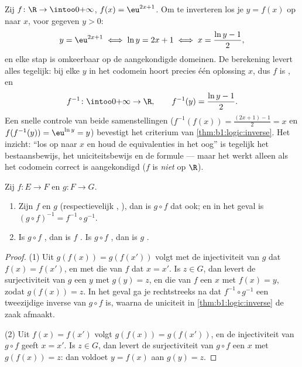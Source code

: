 \begin{example}\label{ex:b1:logic:inversecomp}
Zij $f \colon \R \to \intoo0{+\infty}$, $f(x) = \eu^{2x+1}$. Om te
inverteren los je $y = f(x)$ op naar $x$, voor gegeven $y > 0$:
\[
y = \eu^{2x+1} \iff \ln y = 2x + 1 \iff x = \frac{\ln y - 1}2 ,
\]
en elke stap is omkeerbaar op de aangekondigde domeinen. De berekening
levert alles tegelijk: bij elke $y$ in het codomein hoort precies één
oplossing $x$, dus $f$ is , en
\[
f^{-1} \colon \intoo0{+\infty} \to \R,
\qquad
f^{-1}(y) = \frac{\ln y - 1}2 .
\]
Een snelle controle van beide samenstellingen ($f^{-1}(f(x)) =
\frac{(2x+1) - 1}2 = x$ en $f(f^{-1}(y)) = \eu^{\ln y} = y$) bevestigt
het criterium van \cref{thm:b1:logic:inverse}. Het inzicht: ``los op naar
$x$ en houd de equivalenties in het oog'' is tegelijk het bestaansbewijs,
het uniciteitsbewijs en de formule --- maar het werkt alleen als het
codomein correct is aangekondigd ($f$ is \emph{niet}  op $\R$).
\end{example}

\begin{proposition}\label{prop:b1:logic:comp}
Zij $f \colon E \to F$ en $g \colon F \to G$.
\begin{enumerate}
  \item Zijn $f$ en $g$  (respectievelijk ,
        ), dan is $g \circ f$ dat ook; en in het 
        geval is $(g \circ f)^{-1} = f^{-1} \circ g^{-1}$.
  \item Is $g \circ f$ , dan is $f$ . Is $g \circ f$
        , dan is $g$ .
\end{enumerate}
\end{proposition}

\begin{proof}
(1) Uit $g(f(x)) = g(f(x'))$ volgt met de injectiviteit van $g$ dat
$f(x) = f(x')$, en met die van $f$ dat $x = x'$. Is $z \in G$, dan levert
de surjectiviteit van $g$ een $y$ met $g(y) = z$, en die van $f$ een $x$
met $f(x) = y$, zodat $g(f(x)) = z$. In het  geval ga je
rechtstreeks na dat $f^{-1} \circ g^{-1}$ een tweezijdige inverse van $g
\circ f$ is, waarna de uniciteit in \cref{thm:b1:logic:inverse} de zaak
afmaakt.

(2) Uit $f(x) = f(x')$ volgt $g(f(x)) = g(f(x'))$, en de injectiviteit
van $g \circ f$ geeft $x = x'$. Is $z \in G$, dan levert de surjectiviteit
van $g \circ f$ een $x$ met $g(f(x)) = z$: dan voldoet $y = f(x)$ aan
$g(y) = z$.
\end{proof}

